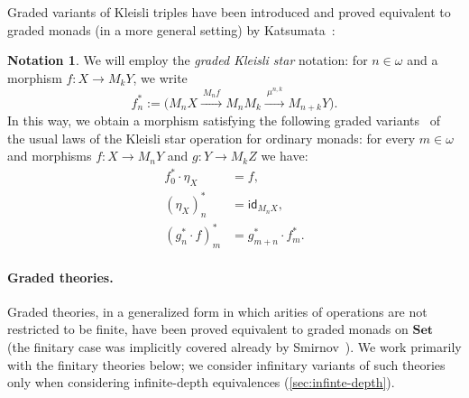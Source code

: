 \documentclass[sigconf,
			final%
			nonacm
                        ]{acmart}
\numberwithin{equation}{section}
\numberwithin{equation}{section}
\theoremstyle{plain}
\theoremstyle{definition}
\newtheorem{notn}[thm]{Notation}
\newcommand{\id}{\mathsf{id}}
\newcommand{\xra}[1]{\xrightarrow{~#1~}}
\newcommand{\Set}{\mathbf{Set}}
\begin{document}
Graded variants of Kleisli triples have been introduced and proved
equivalent to graded monads (in a more general setting)
by Katsumata~\cite{Katsumata14}:

\begin{notn}\label{N:star}
We will employ the \emph{graded Kleisli star} notation:
for $n\in\omega$ and a morphism $f\colon X\to M_k Y$, we
write%
\begin{equation}\label{Eqn:Kleisli-star}
  f^*_n:=  \big(M_nX\xra{M_nf} M_nM_k\xra{\mu^{n,k}}M_{n+k}Y\big).
\end{equation}
In this way, we obtain a morphism satisfying the following graded
variants~\cite[Def.~2.3]{Katsumata14} of the usual laws of the
Kleisli star operation for ordinary monads: for every $m\in\omega$ and
morphisms $f\colon X\to M_nY$ and $g\colon Y\to M_kZ$ we have:%
\begin{align}
  f^*_0\cdot\eta_X &= f,	\label{item:star-2} \\
  (\eta_X)^*_n &= \id_{M_n X}, \label{item:start-3}\\
  (g^*_{n}\cdot f)^*_m &= g^*_{m+n}\cdot f_m^*.    \label{item:star-1}
\end{align}

\end{notn}



\paragraph*{Graded theories.}
Graded theories, in a generalized form in which arities of operations
are not restricted to be finite, have been proved equivalent to graded
monads on $\Set$~\cite{MPS15} (the finitary case was implicitly
covered already by Smirnov~\cite{Smirnov08}).  We work primarily with
the finitary theories below; we consider infinitary variants of such
theories only when considering infinite-depth equivalences
(\cref{sec:infinte-depth}).
%
\end{document}
